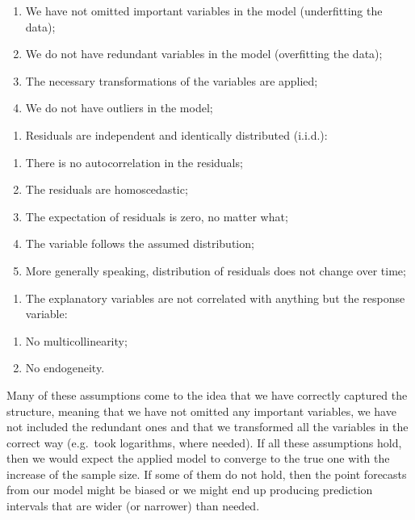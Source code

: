 \documentclass[
]{book}
\providecommand{\tightlist}{%
  \setlength{\itemsep}{0pt}\setlength{\parskip}{0pt}}
\theoremstyle{definition}
\theoremstyle{definition}
\theoremstyle{definition}
\theoremstyle{definition}
\theoremstyle{remark}
\begin{document}
\begin{enumerate}
\def\labelenumi{\alph{enumi}.}
\tightlist
\item
  We have not omitted important variables in the model (underfitting the data);
\item
  We do not have redundant variables in the model (overfitting the data);
\item
  The necessary transformations of the variables are applied;
\item
  We do not have outliers in the model;
\end{enumerate}

\begin{enumerate}
\def\labelenumi{\arabic{enumi}.}
\setcounter{enumi}{1}
\tightlist
\item
  Residuals are independent and identically distributed (i.i.d.):
\end{enumerate}

\begin{enumerate}
\def\labelenumi{\alph{enumi}.}
\tightlist
\item
  There is no autocorrelation in the residuals;
\item
  The residuals are homoscedastic;
\item
  The expectation of residuals is zero, no matter what;
\item
  The variable follows the assumed distribution;
\item
  More generally speaking, distribution of residuals does not change over time;
\end{enumerate}

\begin{enumerate}
\def\labelenumi{\arabic{enumi}.}
\setcounter{enumi}{2}
\tightlist
\item
  The explanatory variables are not correlated with anything but the response variable:
\end{enumerate}

\begin{enumerate}
\def\labelenumi{\alph{enumi}.}
\tightlist
\item
  No multicollinearity;
\item
  No endogeneity.
\end{enumerate}

Many of these assumptions come to the idea that we have correctly captured the structure, meaning that we have not omitted any important variables, we have not included the redundant ones and that we transformed all the variables in the correct way (e.g.~took logarithms, where needed). If all these assumptions hold, then we would expect the applied model to converge to the true one with the increase of the sample size. If some of them do not hold, then the point forecasts from our model might be biased or we might end up producing prediction intervals that are wider (or narrower) than needed.
\end{document}
